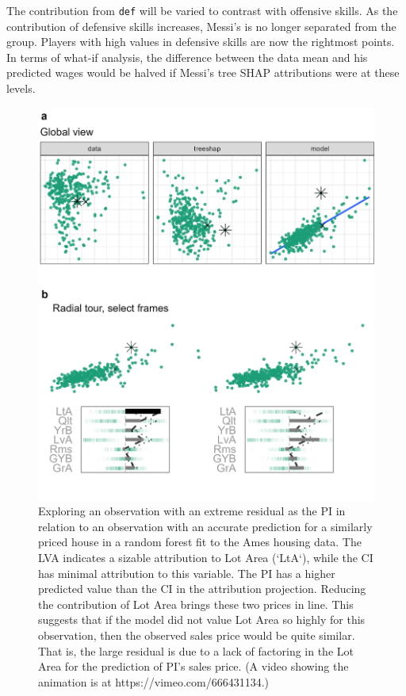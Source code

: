 \documentclass[
]{article}
\begin{document}
The contribution from \texttt{def} will be varied to contrast with offensive skills. As the contribution of defensive skills increases, Messi's is no longer separated from the group. Players with high values in defensive skills are now the rightmost points. In terms of what-if analysis, the difference between the data mean and his predicted wages would be halved if Messi's tree SHAP attributions were at these levels.

\begin{figure}

{\centering \includegraphics[width=0.9\linewidth]{./figures/case_ames2018} 

}

\caption{Exploring an observation with an extreme residual as the PI in relation to an observation with an accurate prediction for a similarly priced house in a random forest fit to the Ames housing data. The LVA indicates a sizable attribution to Lot Area (`LtA`), while the CI has minimal attribution to this variable. The PI has a higher predicted value than the CI in the attribution projection. Reducing the contribution of Lot Area brings these two prices in line. This suggests that if the model did not value Lot Area so highly for this observation, then the observed sales price would be quite similar. That is, the large residual is due to a lack of factoring in the Lot Area for the prediction of PI's sales price. (A video showing the animation is at https://vimeo.com/666431134.)}\label{fig:caseames}
\end{figure}
\end{document}
